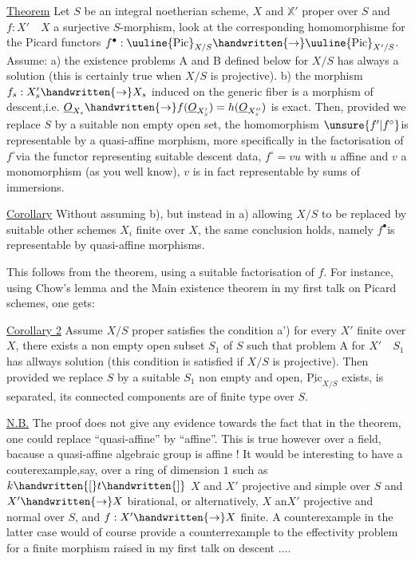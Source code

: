 \uline{Theorem} Let $S$ be an integral noetherian scheme, $X$ and $\mathbb{X}'$ proper over $S$ and $f:X'\quad X$ a surjective $S$-morphism, look at the corresponding homomorphisme for the Picard functors $f^{\bullet}:\text{\uuline{Pic}}_{X/S}\handwritten{\to}\text{\uuline{Pic}}_{X'/S}$. Assume: a) the existence problems A and B defined below for $X/S$ has always a solution (this is certainly true when $X/S$ is projective). b) the morphism $f_{s}:X'_{s}\handwritten{\to}X_{s}$ induced on the generic fiber is a morphism of descent,i.e. $\underline{O}_{X_{s}}\handwritten{\to}f(\underline{O}_{X'_{s}})=h(\underline{O}_{X''_{s}})$ is exact. Then, provided we replace $S$ by a suitable non empty open set, the homomorphism $\unsure{f'|f^{\circ}}$is representable by a quasi-affine morphism, more specifically \unsure{;|:} in the factorisation of $f^{\circ}$via the functor representing suitable descent data, $f^{\circ}=vu$ with $u$ affine and $v$ a monomorphism (as you well know), $v$ is in fact representable by   sums of immersions.

\uline{Corollary} Without assuming b), but instead in a) allowing $X/S$ to be replaced by suitable other schemes $X_{i}$ finite over $X$, the same conclusion  holds, namely $f^{\bullet}$is representable by quasi-affine morphisms.

This follows from the theorem, using a suitable factorisation of $f$. For instance, using Chow's lemma and the Main existence theorem in my first talk on Picard schemes, one gets:

\uline{Corollary 2} Assume $X/S$ proper satisfies the condition a') for every $X'$ finite over $X$, there exists a non empty open subset $S_{1}$ of $S$ such that problem A for $X'\quad S_{1}$ has allways solution  (this condition is satisfied if $X/S$ is projective). Then provided we replace $S$ by a suitable $S_{1}$ non empty and open, $\underline{\mathrm{Pic}}_{X/S}$ exists, is separated, its connected components are of finite type over $S$.

\uline{N.B.} The proof does not give any evidence towards the fact that in
the theorem, one could replace ``quasi-affine'' by ``affine''. This is true however over a field, bacause a quasi-affine algebraic group is affine ! It would be interesting to have a couterexample,say, over a ring of dimension $1$ such as $k\handwritten{[}t\handwritten{]}$\handwritten{,} $X$ and $X'$ projective and simple over $S$ and $X'\handwritten{\to}X$ birational, or alternatively, $X$ an$X'$ projective and normal over $S$, and $f:X'\handwritten{\to}X$ finite. A counterexample in the latter case would of course provide a counterrexample to the effectivity problem for a finite morphism raised in my first talk on descent ....

